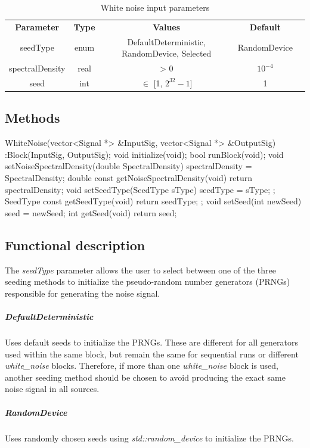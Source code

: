 \begin{table}[h]
	\centering
	\begin{tabular}{|c|c|c|c|c}
		\cline{1-4}
		\textbf{Parameter} & \textbf{Type} &\textbf{Values} &   \textbf{Default}& \\ \cline{1-4}
		seedType 		 & enum & DefaultDeterministic, RandomDevice, Selected & RandomDevice \\ \cline{1-4}
		spectralDensity  & real & > 0  			& $10^{-4}$ \\ \cline{1-4}
		seed 	   		 & int & $\in$ [1, $2^{32}-1$] 	& 1 \\ \cline{1-4} \cline{1-4}
	\end{tabular}
	\caption{White noise input parameters}
	\label{table:bin_sour_in_par}
\end{table}

\subsection*{Methods}

WhiteNoise(vector<Signal *> \&InputSig, vector<Signal *> \&OutputSig) :Block(InputSig, OutputSig){};
\bigbreak	
void initialize(void);
bool runBlock(void);
\bigbreak
void setNoiseSpectralDensity(double SpectralDensity) { spectralDensity = SpectralDensity; }
double const getNoiseSpectralDensity(void){ return spectralDensity; }
\bigbreak
void setSeedType(SeedType sType){ seedType = sType; };
SeedType const getSeedType(void){ return seedType; };
\bigbreak
void setSeed(int newSeed) { seed = newSeed; }
int getSeed(void){ return seed; }

\subsection*{Functional description}

The \textit{seedType} parameter allows the user to select between one of the three seeding methods to initialize the pseudo-random number generators (PRNGs) responsible for generating the noise signal.

\subparagraph*{DefaultDeterministic}
Uses default seeds to initialize the PRNGs. These are different for all generators used within the same block, but remain the same for sequential runs or different \textit{white\_noise} blocks. Therefore, if more than one \textit{white\_noise} block is used, another seeding method should be chosen to avoid producing the exact same noise signal in all sources.

\subparagraph*{RandomDevice}
Uses randomly chosen seeds using \textit{std::random\_device} to initialize the PRNGs.

